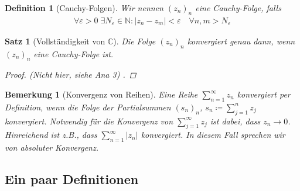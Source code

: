 \documentclass[11pt, a4paper]{article}
\theoremstyle{plain}
\newtheorem{bemerkung}[blockelement]{Bemerkung}
\newtheorem{definition}[blockelement]{Definition}
\newtheorem{satz}[blockelement]{Satz}
\numberwithin{equation}{subsection}
\newcommand{\abs}[1]{\left\lvert#1\right\rvert}
\newcommand{\ex}{\;\exists}
\newcommand{\N}{\mathbb{N}}
\newcommand{\C}{\mathbb{C}}
\begin{document}
    \begin{definition}[Cauchy-Folgen]
        Wir nennen $(z_n)_n$ eine Cauchy-Folge, falls
        \begin{align*}
            \forall\varepsilon > 0\ex N_{\varepsilon}\in\N\colon \abs{z_n - z_m} < \varepsilon\quad\forall n,m > N_{\varepsilon}
        \end{align*}
    \end{definition}

    \begin{satz}[Vollständigkeit von $\C$]
        Die Folge $(z_n)_n$ konvergiert genau dann, wenn $(z_n)_n$ eine Cauchy-Folge ist.
        \begin{proof}
        (Nicht hier, siehe Ana 3)
            .
        \end{proof}
    \end{satz}

    \begin{bemerkung}[Konvergenz von Reihen]
        Eine Reihe $ \sum_{n=1}^{\infty} z_n$ konvergiert per Definition, wenn die Folge der Partialsummen $(s_n)_n$, $s_n \coloneqq \sum_{j=1}^{n} z_j$ konvergiert. Notwendig für die Konvergenz von $ \sum_{j=1}^{\infty} z_j$ ist dabei, dass $z_n \to 0$. Hinreichend ist z.B., dass $ \sum_{n=1}^{\infty} \abs{z_n}$ konvergiert. In diesem Fall sprechen wir von absoluter Konvergenz.
    \end{bemerkung}

    \subsection{Ein paar Definitionen}
\end{document}
